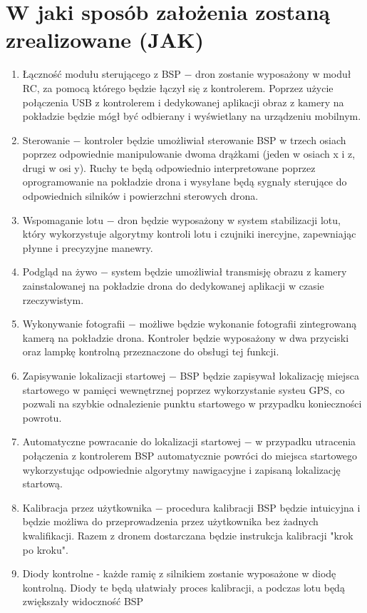 \documentclass[12pt]{article}
\begin{document}
\section{W jaki sposób założenia zostaną zrealizowane (JAK)}
\begin{enumerate}
    \item Łączność modułu sterującego z BSP $ - $ dron zostanie wyposażony w moduł RC, za pomocą którego będzie łączył się z kontrolerem. Poprzez użycie połączenia USB z kontrolerem i dedykowanej aplikacji obraz z kamery na pokładzie będzie mógł być odbierany i wyświetlany na urządzeniu mobilnym.
    \item Sterowanie $ - $ kontroler będzie umożliwiał sterowanie BSP w trzech osiach poprzez odpowiednie manipulowanie dwoma drążkami (jeden w osiach x i z, drugi w osi y). Ruchy te będą odpowiednio interpretowane poprzez oprogramowanie na pokładzie drona i wysyłane będą sygnały sterujące do odpowiednich silników i powierzchni sterowych drona.
    \item Wspomaganie lotu $ - $ dron będzie wyposażony w system stabilizacji lotu, który wykorzystuje algorytmy kontroli lotu i czujniki inercyjne, zapewniając płynne i precyzyjne manewry.
    \item Podgląd na żywo $ - $ system będzie umożliwiał transmisję obrazu z kamery zainstalowanej na pokładzie drona do dedykowanej aplikacji  w czasie rzeczywistym.
    \item Wykonywanie fotografii $ - $ możliwe będzie wykonanie fotografii zintegrowaną kamerą na pokładzie drona. Kontroler będzie wyposażony w dwa przyciski oraz lampkę kontrolną przeznaczone do obsługi tej funkcji.
    \item Zapisywanie lokalizacji startowej $ - $ BSP będzie zapisywał lokalizację miejsca startowego w pamięci wewnętrznej poprzez wykorzystanie systeu GPS, co pozwali na szybkie odnalezienie punktu startowego w przypadku konieczności powrotu.
    \item Automatyczne powracanie do lokalizacji startowej $ - $ w przypadku utracenia połączenia z kontrolerem BSP automatycznie powróci do miejsca startowego wykorzystując odpowiednie algorytmy nawigacyjne i zapisaną lokalizację startową.
    \item Kalibracja przez użytkownika $ - $ procedura kalibracji BSP będzie intuicyjna i będzie możliwa do przeprowadzenia przez użytkownika bez żadnych kwalifikacji. Razem z dronem dostarczana będzie instrukcja kalibracji "krok po kroku".
    \item Diody kontrolne - każde ramię z silnikiem zostanie wyposażone w diodę kontrolną. Diody te będą ułatwiały proces kalibracji, a podczas lotu będą zwiększały widoczność BSP
\end{enumerate}
\end{document}
